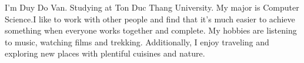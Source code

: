 \par{
I’m Duy Do Van. Studying at Ton Duc Thang University. My major is Computer Science.I like to work with other people and find that it's much easier to achieve something when everyone works together and complete.  My hobbies are listening to music, watching films and trekking. Additionally, I enjoy traveling and exploring new places with plentiful cuisines and nature.

}
